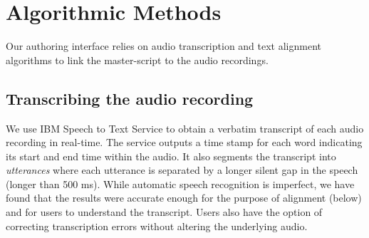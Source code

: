 \section{Algorithmic Methods}
\label{sec:algorithms}
Our authoring interface relies on audio transcription and text alignment algorithms to link the master-script to the audio recordings.  

\subsection{Transcribing the audio recording}
We use IBM Speech to Text Service \cite{ibmspeechtotext} to obtain a verbatim transcript of each audio recording in real-time. The service outputs a time stamp for each word indicating its start and end time within the audio. It also segments the transcript into \textit{utterances} where each utterance is separated by a longer silent gap in the speech (longer than 500 ms). While automatic speech recognition is imperfect, we have found that the results were accurate enough for the purpose of alignment (below) and for users to understand the transcript. Users also have the option of correcting transcription errors without altering the underlying audio.
  

